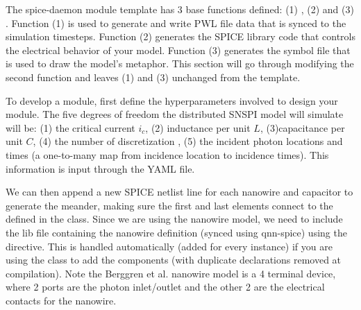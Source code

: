 \begin{sloppypar}
The spice-daemon module template has 3 base functions defined: (1) ,
(2)  and (3) . Function (1) is used to generate 
and write PWL file data that is synced to the simulation timesteps. Function (2)
generates the SPICE library code that controls the electrical behavior of your model.
Function (3) generates the symbol file that is used to draw the model's metaphor. This
section will go through modifying the second function and leaves (1) and (3) unchanged
from the template.
\end{sloppypar}

To develop a module, first define the hyperparameters involved to design your module.
The five degrees of freedom the distributed SNSPI model will simulate will be: (1) the
critical current $i_c$, (2) inductance per unit $L$, (3)capacitance per unit $C$, 
(4) the number of discretization
, (5) the incident photon locations and times (a one-to-many map from incidence 
location to incidence times). This information is input through the YAML file.

We can then append a new SPICE netlist line for each nanowire and capacitor to generate the
meander, making sure the first and last elements connect to the  defined in the 
class. Since we are using the nanowire model, we need to include the lib file containing
the nanowire definition (synced using qnn-spice) using the  directive. This is
handled automatically (added for every instance) if you are using the  
class to add the components
(with duplicate declarations removed at compilation).
Note the
Berggren et al. nanowire model is a 4 terminal device, where 2 ports are the photon inlet/outlet
and the other 2 are the electrical contacts for the nanowire. 

